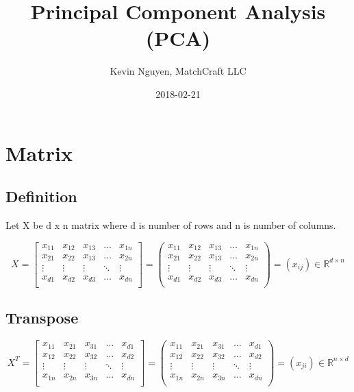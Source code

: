 \documentclass{article}
\title{Principal Component Analysis (PCA)}
\date{2018-02-21}
\author{Kevin Nguyen, MatchCraft LLC}
\begin{document}
\maketitle

\section{Matrix}
\subsection{Definition}
Let X be d x n matrix where d is number of rows and n is number of columns.

$$
X =
\begin{bmatrix}
  x_{11} & x_{12} & x_{13} & \dots & x_{1n} \\
  x_{21} & x_{22} & x_{13} & \dots & x_{2n} \\
  \vdots & \vdots & \vdots & \ddots & \vdots \\
  x_{d1} & x_{d2} & x_{d3} & \dots & x_{dn} \\
\end{bmatrix}
=
\begin{pmatrix}
  x_{11} & x_{12} & x_{13} & \dots & x_{1n} \\
  x_{21} & x_{22} & x_{13} & \dots & x_{2n} \\
  \vdots & \vdots & \vdots & \ddots & \vdots \\
  x_{d1} & x_{d2} & x_{d3} & \dots & x_{dn} \\
\end{pmatrix}
= (x_{ij}) \in \mathbb{R}^{d \times n}
$$

\subsection{Transpose}

$$
X^T = 
\begin{bmatrix}
  x_{11} & x_{21} & x_{31} & \dots & x_{d1} \\
  x_{12} & x_{22} & x_{32} & \dots & x_{d2} \\
  \vdots & \vdots & \vdots & \ddots & \vdots \\
  x_{1n} & x_{2n} & x_{3n} & \dots & x_{dn} \\
\end{bmatrix}
=
\begin{pmatrix}
  x_{11} & x_{21} & x_{31} & \dots & x_{d1} \\
  x_{12} & x_{22} & x_{32} & \dots & x_{d2} \\
  \vdots & \vdots & \vdots & \ddots & \vdots \\
  x_{1n} & x_{2n} & x_{3n} & \dots & x_{dn} \\
\end{pmatrix}
= (x_{ji}) \in \mathbb{R}^{n \times d}
$$
\end{document}

